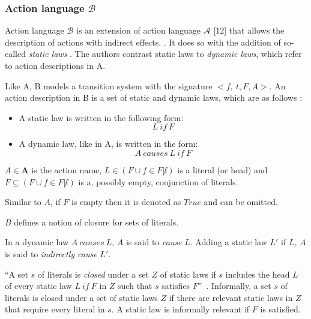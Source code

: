 \subsubsection{Action language $ \mathcal{B} $}
\label{subsubsec:action_language_b}

Action language $ \mathcal{B} $ is an extension of action language $ \mathcal{A} $ [12] that allows the description of actions with indirect effects.
\cite{gelfond_action_1998}.
It does so with the addition of so-called \textit{static laws} \cite{gelfond_action_1998}.
The authors contrast static laws to \textit{dynamic laws}, which refer to action descriptions in A.

Like A, B models a transition system with the signature $<{f,\ t},F,A>$.
An action description in B is a set of static and dynamic laws, which are as follows \cite{gelfond_action_1998}:

\begin{itemize}
    \item A static law is written in the following form:
        $$
        L\ if\ F
        $$

    \item A dynamic law, like in A, is written in the form:
        $$
        A\ causes\ L\ if\ F
        $$
\end{itemize}

$A \in \boldsymbol{A}$ is the action name, $L \in(F \cup{f \in F| \not f})$ is a literal (or head) and $F \subseteq(F \cup{f \in F| \not f})$ is a, possibly empty, conjunction of literals.

Similar to $A$, if $F$ is empty then it is denoted as $True$ and can be omitted.

$B$ defines a notion of closure for sets of literals.

\begin{definition}
    In a dynamic law $A \ causes \ L$, $A$ is said to \textit{cause} $L$.
    Adding a static law $L'$ if $L$, $A$ is said to \textit{indirectly cause} $L'$.
\end{definition}

\begin{definition}
    ``A set $s$ of literals is \textit{closed} under a set $Z$ of static laws if $s$ includes the head $L$ of every static law $L\ if\ F$ in $Z$ such that $s$ satisfies $F$''~\cite{gelfond_action_1998}.
    Informally, a set $s$ of literals is closed under a set of static laws $Z$ if there are relevant static laws in $Z$ that require every literal in $s$.
    A static law is informally relevant if $F$ is satisfied.
\end{definition}

